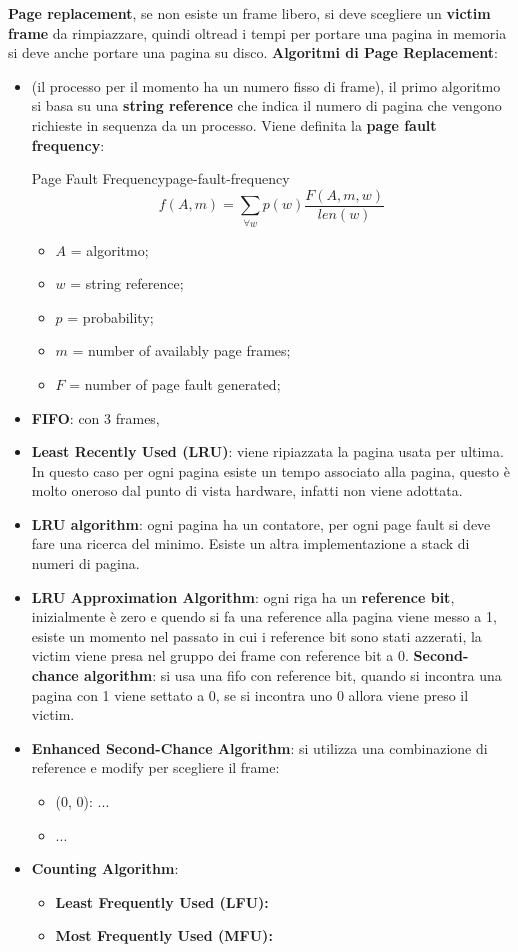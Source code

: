 \documentclass[12pt]{article}
\begin{document}
\textbf{Page replacement}, se non esiste un frame libero, si deve scegliere un \textbf{victim frame} da rimpiazzare, quindi oltread i tempi per portare una pagina in memoria si deve anche portare una pagina su disco. \textbf{Algoritmi di Page Replacement}:
\begin{itemize}
  \item (il processo per il momento ha un numero fisso di frame), il primo algoritmo si basa su una \textbf{string reference} che indica il numero di pagina che vengono richieste in sequenza da un processo. Viene definita la \textbf{page fault frequency}:
    \begin{definition}{Page Fault Frequency}{page-fault-frequency}
      \[ f(A,m) = \sum_{\forall w}^{} p(w) \frac{F(A,m,w)}{len(w)}  \]
      \begin{itemize}
        \item $A$ = algoritmo;
        \item $w$ = string reference;
        \item $p$ = probability;
        \item $m$ = number of availably page frames;
        \item $F$ = number of page fault generated;
      \end{itemize}
    \end{definition}
  \item \textbf{FIFO}: con 3 frames, 
  \item \textbf{Least Recently Used (LRU)}: viene ripiazzata la pagina usata per ultima. In questo caso per ogni pagina esiste un tempo associato alla pagina, questo \`e molto oneroso dal punto di vista hardware, infatti non viene adottata.
  \item \textbf{LRU algorithm}: ogni pagina ha un contatore, per ogni page fault si deve fare una ricerca del minimo. Esiste un altra implementazione a stack di numeri di pagina.
  \item \textbf{LRU Approximation Algorithm}: ogni riga ha un \textbf{reference bit}, inizialmente \`e zero e quendo si fa una reference alla pagina viene messo a 1, esiste un momento nel passato in cui i reference bit sono stati azzerati, la victim viene presa nel gruppo dei frame con reference bit a 0. \textbf{Second-chance algorithm}: si usa una fifo con reference bit, quando si incontra una pagina con 1 viene settato a 0, se si incontra uno 0 allora viene preso il victim.
  \item \textbf{Enhanced Second-Chance Algorithm}: si utilizza una combinazione di reference e modify per scegliere il frame:
    \begin{itemize}
      \item (0, 0): ...
      \item ...
    \end{itemize}
  \item \textbf{Counting Algorithm}: 
    \begin{itemize}
      \item \textbf{Least Frequently Used (LFU):}
      \item \textbf{Most Frequently Used (MFU):}
    \end{itemize}
\end{itemize}
\end{document}
